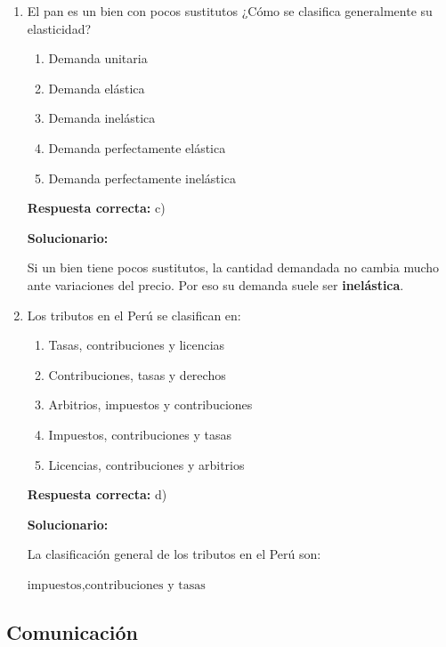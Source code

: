 \begin{enumerate}[resume]
	
	
	\item El pan es un bien con pocos sustitutos ¿Cómo se clasifica generalmente su elasticidad?
	\begin{enumerate}[label=\alph*)]
		\item Demanda unitaria
		\item Demanda elástica
		\item Demanda inelástica
		\item Demanda perfectamente elástica
		\item Demanda perfectamente inelástica
	\end{enumerate}
	\textbf{Respuesta correcta:} c)
	
	\vspace{2mm}
	\textbf{Solucionario:}
	
	Si un bien tiene pocos sustitutos, la cantidad demandada no cambia mucho ante variaciones del precio.  
	Por eso su demanda suele ser \textbf{inelástica}.
	
	\vspace{6mm}
	
	\item Los tributos en el Perú se clasifican en:
	\begin{enumerate}[label=\alph*)]
		\item Tasas, contribuciones y licencias
		\item Contribuciones, tasas y derechos
		\item Arbitrios, impuestos y contribuciones
		\item Impuestos, contribuciones y tasas
		\item Licencias, contribuciones y arbitrios
	\end{enumerate}
	\textbf{Respuesta correcta:} d)
	
	\vspace{2mm}
	\textbf{Solucionario:}
	
	La clasificación general de los tributos en el Perú son:
	
	$ \text{impuestos}, \text{contribuciones} \text{ y } \text{tasas} $
	
	\vspace{5mm}
	
\end{enumerate}

\subsection*{Comunicación}

